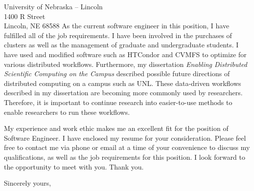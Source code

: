 \documentclass[11pt]{letter} %
\begin{document}
\begin{letter}{University of Nebraska -- Lincoln \\
			1400 R Street \\
			Lincoln, NE 68588}
		As the current software engineer in this position, I have fulfilled all of the job requirements.  I have been involved in the purchases of clusters as well as the management of graduate and undergraduate students.  I have used and modified software such as HTCondor and CVMFS to optimize for various distributed workflows.  Furthermore, my dissertation \textit{Enabling Distributed Scientific Computing on the Campus} described possible future directions of distributed computing on a campus such as UNL.  These data-driven workflows described in my dissertation are becoming more commonly used by researchers.  Therefore, it is important to continue research into easier-to-use methods to enable researchers to run these workflows.
		
		
		My experience and work ethic makes me an excellent fit for the position of Software Engineer.  I have enclosed my resume for your consideration.  Please feel free to contact me via phone or email at a time of your convenience to discuss my qualifications, as well as the job requirements for this position. I look forward to the opportunity to meet with you. Thank you.
		
		\closing{Sincerely yours,}
		
		
		
		
	\end{letter}
	
\end{document}
